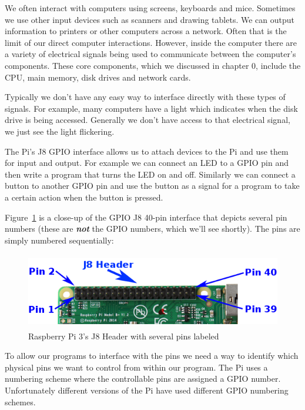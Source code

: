 
We often interact with computers using screens, keyboards and mice. Sometimes we use other input devices
such as scanners and drawing tablets. We can output information to printers or other computers across a network.
Often that is the limit of our direct computer interactions. However, inside the computer there are
a variety of electrical signals being used to communicate between the computer's components. These core components, which
we discussed in chapter 0, include the CPU, main memory, disk drives and network cards.

Typically we don't have any easy way to interface directly with these types of signals. For example, many computers
have a light which indicates when the disk drive is being accessed. Generally we don't have access to that
electrical signal, we just see the light flickering.

The Pi's J8 GPIO interface allows us to attach devices to the Pi and use them for input and output. For example
we can connect an LED to a GPIO pin and then write a program that turns the LED on and off. Similarly we
can connect a button to another GPIO pin and use the button as a signal for a program to take a certain
action when the button is pressed.

Figure~\ref{fig:j8header} is a close-up of the GPIO J8 40-pin interface that depicts several pin numbers (these are \textbf{\textit{not}} the GPIO numbers, which we'll see shortly). The pins are simply numbered sequentially:

\begin{figure}[H]
	\centering
	\includegraphics[height=1.30in]{pi_images/j8header-photo-transparentbg.png}
	\caption{Raspberry Pi 3's J8 Header with several pins labeled}
	\label{fig:j8header}
\end{figure}

To allow our programs to interface with the pins we need a way to identify which physical pins we want to 
control from within our program. The Pi uses a numbering scheme where the controllable pins are assigned
a GPIO number. Unfortunately different versions of the Pi have used different GPIO numbering schemes. 


